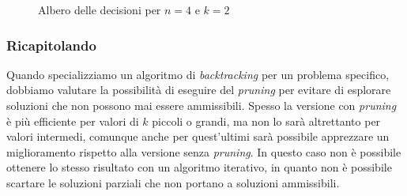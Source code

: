             \begin{figure}[H]
                \centering
                \caption{Albero delle decisioni per $n = 4$ e $k = 2$}
            \end{figure}
        \subsubsection{Ricapitolando}
            Quando specializziamo un algoritmo di \textit{backtracking} per un problema specifico, dobbiamo valutare la possibilità di eseguire del \textit{pruning} per evitare di esplorare soluzioni che non possono mai essere ammissibili. Spesso la versione con \textit{pruning} è più efficiente per valori di $k$ piccoli o grandi, ma non lo sarà altrettanto per valori intermedi, comunque anche per quest'ultimi sarà possibile apprezzare un miglioramento rispetto alla versione senza \textit{pruning}. \newline
            In questo caso non è possibile ottenere lo stesso risultato con un algoritmo iterativo, in quanto non è possibile scartare le soluzioni parziali che non portano a soluzioni ammissibili. 
